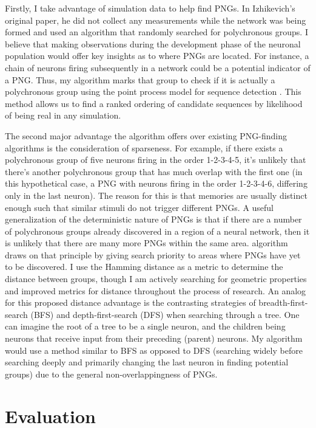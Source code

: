 \documentclass{sigchi}
\begin{document}
Firstly, I take advantage of simulation data to help find PNGs. In Izhikevich's original paper, he did not collect any measurements while the network was being formed and used an algorithm that randomly searched for polychronous groups. I believe that making observations during the development phase of the neuronal population would offer key insights as to where PNGs are located. For instance, a chain of neurons firing subsequently in a network could be a potential indicator of a PNG. Thus, my algorithm marks that group to check if it is actually a polychronous group using the point process model for sequence detection \cite{ppseq}. This method allows us to find a ranked ordering of candidate sequences by likelihood of being real in any simulation.


The second major advantage the algorithm offers over existing PNG-finding algorithms is the consideration of sparseness. For example, if there exists a polychronous group of five neurons firing in the order 1-2-3-4-5, it's unlikely that there's another polychronous group that has much overlap with the first one (in this hypothetical case, a PNG with neurons firing in the order 1-2-3-4-6, differing only in the last neuron). The reason for this is that memories are usually distinct enough such that similar stimuli do not trigger different PNGs. A useful generalization of the deterministic nature of PNGs is that if there are a number of polychronous groups already discovered in a region of a neural network, then it is unlikely that there are many more PNGs within the same area.  algorithm draws on that principle by giving search priority to areas where PNGs have yet to be discovered. I use the Hamming distance as a metric to determine the distance between groups, though I am actively searching for geometric properties and improved metrics for distance throughout the process of research. An analog for this proposed distance advantage is the contrasting strategies of breadth-first-search (BFS) and depth-first-search (DFS) when searching through a tree. One can imagine the root of a tree to be a single neuron, and the children being neurons that receive input from their preceding (parent) neurons. My algorithm would use a method similar to BFS as opposed to DFS (searching widely before searching deeply and primarily changing the last neuron in finding potential groups) due to the general non-overlappingness of PNGs.

\section{Evaluation}
\end{document}
